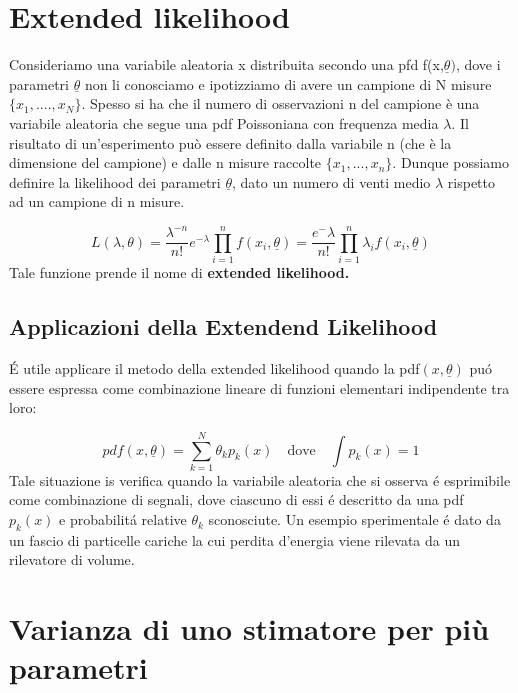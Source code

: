\documentclass[11pt,a4paper]{book}
\begin{document}
\section{Extended likelihood}

Consideriamo una variabile aleatoria x distribuita secondo una pfd f(x,$\underline{\theta})$, dove i parametri $\underline{\theta}$ non li conosciamo e ipotizziamo di avere un campione di N misure $\{x_1,....,x_N\}$. Spesso si ha che il numero di osservazioni n del campione \`{e} una variabile aleatoria che segue una pdf Poissoniana con frequenza media $\lambda$. Il risultato di un'esperimento pu\`{o} essere definito dalla variabile n (che \`{e} la dimensione del campione) e dalle n misure raccolte $\{x_1,...,x_n\}.$ \newline
Dunque possiamo definire la likelihood dei parametri $\underline{\theta}$, dato un numero di venti medio $\lambda$ rispetto ad un campione di n misure.

\begin{equation}
	L(\lambda,\theta) = \dfrac{\lambda^{-n}}{n!}e^{-\lambda} \prod_{i=1}^nf(x_i,\underline{\theta}) = \dfrac{e^-{\lambda}}{n!} \prod_{i=1}^{n} \lambda_{i}f(x_i,\underline{\theta})
\end{equation}
Tale funzione prende il nome di \textbf{extended likelihood.}

\subsection{Applicazioni della Extendend Likelihood}
\'{E} utile applicare il metodo della extended likelihood quando la pdf$(x,\underline{\theta})$ pu\'{o} essere espressa come combinazione lineare di funzioni elementari indipendente tra loro:

\begin{equation*}
	pdf(x, \underline{\theta}) = \sum_{k=1}^N\theta_kp_k(x) \quad \text{dove} \quad \int p_k(x) = 1
\end{equation*}
Tale situazione is verifica quando la variabile aleatoria che si osserva \'{e} esprimibile come combinazione di segnali, dove ciascuno di essi \'{e} descritto da una pdf $p_k(x)$ e probabilit\'{a} relative $\theta_k$ sconosciute. \newline
Un esempio sperimentale \'{e} dato da un fascio di particelle cariche la cui perdita d'energia viene rilevata da un rilevatore di volume. 
\section{Varianza di uno stimatore per pi\`{u} parametri}
\end{document}
